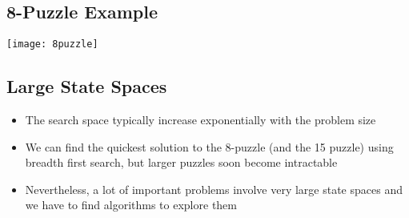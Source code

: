 
\begin{slide}
\section{8-Puzzle Example}

\begin{center}
  \texttt{[image: 8puzzle]}
\end{center}
\end{slide}


\begin{slide}
\section{Large State Spaces}

\begin{PauseHighLight}
  \begin{itemize}
  \item The search space typically increase exponentially with the
    problem size\pause
  \item We can find the quickest solution to the 8-puzzle (and the 15
    puzzle) using breadth first search, but larger puzzles soon become
    intractable\pause
  \item Nevertheless, a lot of important problems involve very large
    state spaces and we have to find algorithms to explore them\pause
  \end{itemize}
\end{PauseHighLight}

\end{slide}



\Outline %

